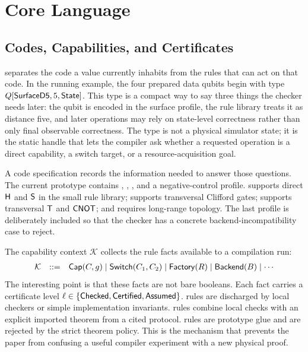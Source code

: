 \section{Core Language}

\subsection{Codes, Capabilities, and Certificates}

\system separates the code a value currently inhabits from the rules that can act on that code.
In the running example, the four prepared data qubits begin with type $Q[\mathsf{SurfaceD5},5,\mathsf{State}]$.
This type is a compact way to say three things the checker needs later: the qubit is encoded in the surface profile, the rule library treats it as distance five, and later operations may rely on state-level correctness rather than only final observable correctness.
The type is not a physical simulator state; it is the static handle that lets the compiler ask whether a requested operation is a direct capability, a switch target, or a resource-acquisition goal.

A code specification records the information needed to answer those questions.
The current prototype contains , , , and a negative-control  profile.
 supports direct $\mathsf{H}$ and $\mathsf{S}$ in the small rule library;  supports transversal Clifford gates;  supports transversal $\mathsf{T}$ and $\mathsf{CNOT}$; and  requires long-range topology.
The last profile is deliberately included so that the checker has a concrete backend-incompatibility case to reject.

The capability context $\mathcal{K}$ collects the rule facts available to a compilation run:
\[
\begin{array}{rcl}
\mathcal{K} &::=& \mathsf{Cap}(C,g) \mid \mathsf{Switch}(C_1,C_2) \mid \mathsf{Factory}(R) \mid \mathsf{Backend}(B) \mid \cdots
\end{array}
\]
The interesting point is that these facts are not bare booleans.
Each fact carries a certificate level $\ell\in\{\mathsf{Checked},\mathsf{Certified},\mathsf{Assumed}\}$.
\Checked{} rules are discharged by local checkers or simple implementation invariants.
\Certified{} rules combine local checks with an explicit imported theorem from a cited protocol.
\Assumed{} rules are prototype glue and are rejected by the strict theorem policy.
This is the mechanism that prevents the paper from confusing a useful compiler experiment with a new physical proof.

